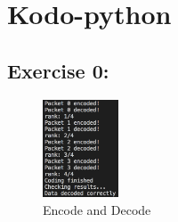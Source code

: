 \section{Kodo-python}

\subsection{Exercise 0:}
\begin{figure}[H]
    \centering
    \includegraphics[width=0.2\textwidth]{figures/KodoPython/encode_decode.png}
    \caption{Encode and Decode}
    \label{fig:encode_decode}
\end{figure}

